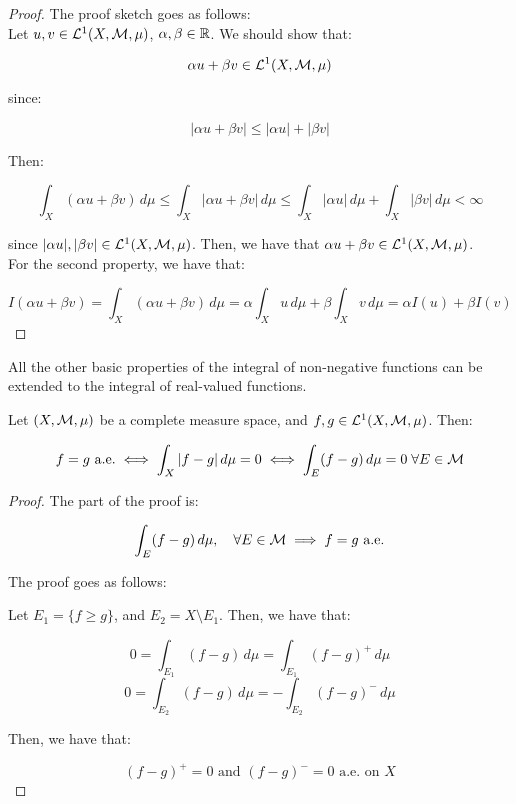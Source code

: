 \begin{proof}
    The proof sketch goes as follows:\\

    Let $u, v \in \mathcal{L}^1(X, \mathcal{M}, \mu)$, $\alpha, \beta \in \mathbb{R}$. We should
    show that:

    $$\alpha u + \beta v \in \mathcal{L}^1(X, \mathcal{M}, \mu)$$

    since:

    $$|\alpha u + \beta v| \leq |\alpha u| + |\beta v|$$

    Then:

    $$\int_{X} (\alpha u + \beta v) \, d\mu \leq \int_{X} |\alpha u + \beta v| \, d\mu \leq  \int_{X} |\alpha u| \, d\mu + \int_{X} |\beta v| \, d\mu < \infty$$

    since $|\alpha u|, |\beta v| \in \mathcal{L}^1(X, \mathcal{M}, \mu)$.
    Then, we have that $\alpha u + \beta v \in \mathcal{L}^1(X, \mathcal{M}, \mu)$.\\

    For the second property, we have that:

    $$I(\alpha u + \beta v) = \int_{X} (\alpha u + \beta v) \, d\mu = \alpha \int_{X} u \, d\mu + \beta \int_{X} v \, d\mu = \alpha I(u) + \beta I(v)$$
\end{proof}

\begin{fremark}
    All the other basic properties of the integral of non-negative functions
    can be extended to the integral of real-valued functions.
\end{fremark}

\vspace{1em}

\begin{ftheorem}
    Let $(X, \mathcal{M}, \mu)$ be a complete measure space,
    and $f, g \in \mathcal{L}^1(X, \mathcal{M}, \mu)$. Then:

    $$f = g \text{ a.e.} \iff \int_{X} |f - g| \, d\mu = 0 \iff \int_{E} (f - g) \, d\mu = 0 \; \forall E \in \mathcal{M}$$
    
\end{ftheorem}

\begin{proof}
    The  part of the proof is:

    $$ \int_{E} (f - g) \, d\mu, \quad \forall E \in \mathcal{M} \implies f = g \text{ a.e.}$$

    The proof goes as follows:

    Let $E_1 = \{f \geq g\}$, and $E_2 = X \setminus E_1$. Then, we have that:

    $$0 = \int_{E_1} (f - g) \, d\mu = \int_{E_1}  (f - g)^+ \, d\mu$$
    $$0 = \int_{E_2} (f - g) \, d\mu = -\int_{E_2}  (f - g)^- \, d\mu$$

    Then, we have that:

    $$(f - g)^+ = 0 \text{ and } (f - g)^- = 0 \text{ a.e. on } X$$
\end{proof}

